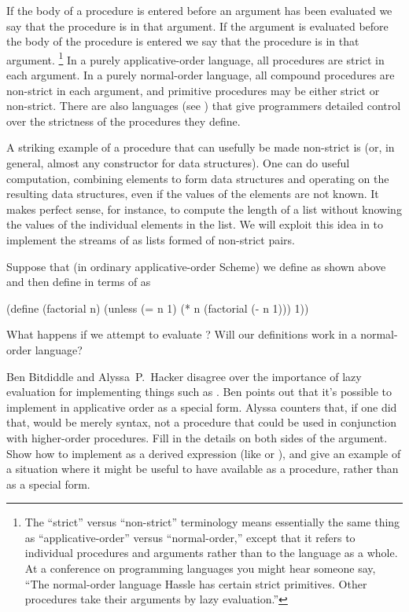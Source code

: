 If the body of a procedure is entered before an argument has been evaluated we say that the procedure is  in that argument.
If the argument is evaluated before the body of the procedure is entered we say that the procedure is  in that argument.%
\footnote{
	The “strict” versus “non-strict” terminology means essentially the same thing as “applicative-order”  versus  “normal-order,” except that it refers to individual procedures and arguments rather than to the language as a whole.
	At a conference on programming languages you might hear someone say, “The normal-order language Hassle has certain strict primitives.
	Other procedures take their arguments by lazy evaluation.”
}
In a purely applicative-order language, all procedures are strict in each argument.
In a purely normal-order language, all compound procedures are non-strict in each argument, and primitive procedures may be either strict or non-strict.
There are also languages (see ) that give programmers detailed control over the strictness of the procedures they define.

A striking example of a procedure that can usefully be made non-strict is  (or, in general, almost any constructor for data structures).
One can do useful computation, combining elements to form data structures and operating on the resulting data structures, even if the values of the elements are not known.
It makes perfect sense, for instance, to compute the length of a list without knowing the values of the individual elements in the list.
We will exploit this idea in  to implement the streams of  as lists formed of non-strict  pairs.



\begin{exercise}
	\label{Exercise 4.25}
	Suppose that (in ordinary applicative-order Scheme) we define  as shown above and then define  in terms of  as
	\begin{scheme}
	  (define (factorial n)
	    (unless (= n 1)
	            (* n (factorial (- n 1)))
	            1))
	\end{scheme}
	What happens if we attempt to evaluate ?
	Will our definitions work in a normal-order language?
\end{exercise}



\begin{exercise}
	\label{Exercise 4.26}
	Ben Bitdiddle and Alyssa P. Hacker disagree over the importance of lazy evaluation for implementing things such as .
	Ben points out that it’s possible to implement  in applicative order as a special form.
	Alyssa counters that, if one did that,  would be merely syntax, not a procedure that could be used in conjunction with higher-order procedures.
	Fill in the details on both sides of the argument.
	Show how to implement  as a derived expression (like  or ), and give an example of a situation where it might be useful to have  available as a procedure, rather than as a special form.
\end{exercise}
